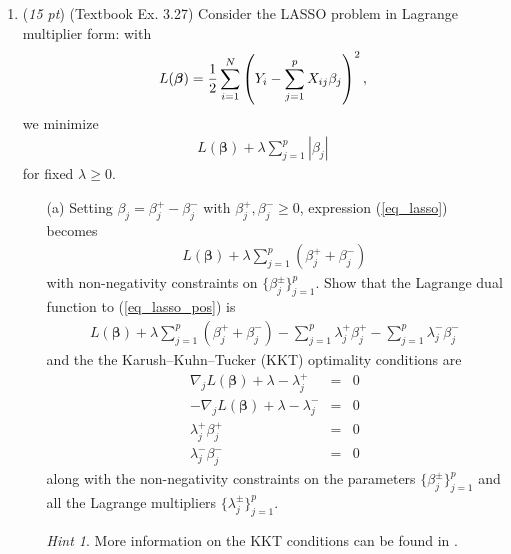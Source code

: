\documentclass[10pt]{article}
\theoremstyle{definition}
\theoremstyle{remark}
\newtheorem*{hint}{Hint}
\newcommand{\bbeta}{\bm{\beta}}
\begin{document}
\begin{enumerate}
	\item (\textit{15 pt}) (Textbook Ex. 3.27) Consider the LASSO problem in Lagrange multiplier form: with 
	\[ L(\bbeta) = {1 \over 2}\sum_{i=1}^{N}\left (Y_{i} - \sum_{j=1}^{p}X_{ij}\beta_{j} \right )^{2}, \]
	we minimize
	\begin{align}
	L(\bbeta) + \lambda \sum_{j=1}^{p}|\beta_{j}| \label{eq_lasso}
	\end{align}
	for fixed $ \lambda \ge 0 $.
	\begin{itemize}[leftmargin=*]
		\item [(a)] Setting $ \beta_{j} = \beta_{j}^{+} - \beta_{j}^{-} $ with $ \beta_{j}^{+},\beta_{j}^{-} \ge 0 $, expression (\ref{eq_lasso}) becomes 
		\begin{align}
		L(\bbeta) + \lambda \sum_{j=1}^{p}(\beta_{j}^{+} + \beta_{j}^{-}) \label{eq_lasso_pos}
		\end{align}
		with non-negativity constraints on $ \{ \beta_{j}^{\pm} \}_{j=1}^{p} $. Show that the Lagrange dual function to (\ref{eq_lasso_pos}) is
		\begin{align*}
		L(\bbeta) + \lambda\sum_{j=1}^{p}(\beta_{j}^{+} + \beta_{j}^{-}) - \sum_{j=1}^{p}\lambda_{j}^{+}\beta_{j}^{+} - \sum_{j=1}^{p}\lambda_{j}^{-}\beta_{j}^{-}
		\end{align*}
		and the the Karush–Kuhn–Tucker (KKT) optimality conditions are
		\[ \begin{array}{rll}
		 \nabla_{j}L(\bbeta) + \lambda - \lambda_{j}^{+} & = & 0\\
		-\nabla_{j}L(\bbeta) + \lambda - \lambda_{j}^{-} & = & 0\\
		\lambda_{j}^{+}\beta_{j}^{+} & = & 0\\
		\lambda_{j}^{-}\beta_{j}^{-} & = & 0
		\end{array} \]
		along with the non-negativity constraints on the parameters $ \{ \beta_{j}^{\pm} \}_{j=1}^{p} $ and all the Lagrange multipliers $ \{ \lambda_{j}^{\pm} \}_{j=1}^{p} $.
		\begin{hint}
			More information on the KKT conditions can be found in \cite{boyd2004convex}.
		\end{hint}
	

\end{itemize}
\end{enumerate}
\end{document}
